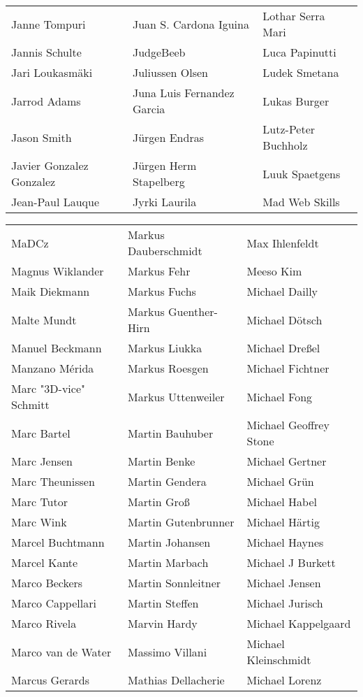 \begin{tabular}{p{4.5cm}p{4.5cm}p{4.5cm}}
Janne Tompuri & Juan S. Cardona Iguina & Lothar Serra Mari \\
Jannis Schulte & JudgeBeeb & Luca Papinutti \\
Jari Loukasmäki & Juliussen Olsen & Ludek Smetana \\
Jarrod Adams & Juna Luis Fernandez Garcia & Lukas Burger \\
Jason Smith & Jürgen Endras & Lutz-Peter Buchholz \\
Javier Gonzalez Gonzalez & Jürgen Herm Stapelberg & Luuk Spaetgens \\
Jean-Paul Lauque & Jyrki Laurila & Mad Web Skills \\
\end{tabular}
\newpage
\setlength{\tabcolsep}{1mm}
\begin{tabular}{p{4.5cm}p{4.5cm}p{4.5cm}}
MaDCz & Markus Dauberschmidt & Max Ihlenfeldt \\
Magnus Wiklander & Markus Fehr & Meeso Kim \\
Maik Diekmann & Markus Fuchs & Michael Dailly \\
Malte Mundt & Markus Guenther-Hirn & Michael Dötsch \\
Manuel Beckmann & Markus Liukka & Michael Dreßel \\
Manzano Mérida & Markus Roesgen & Michael Fichtner \\
Marc "3D-vice" Schmitt & Markus Uttenweiler & Michael Fong \\
Marc Bartel & Martin Bauhuber & Michael Geoffrey Stone \\
Marc Jensen & Martin Benke & Michael Gertner \\
Marc Theunissen & Martin Gendera & Michael Grün \\
Marc Tutor & Martin Groß & Michael Habel \\
Marc Wink & Martin Gutenbrunner & Michael Härtig \\
Marcel Buchtmann & Martin Johansen & Michael Haynes \\
Marcel Kante & Martin Marbach & Michael J Burkett \\
Marco Beckers & Martin Sonnleitner & Michael Jensen \\
Marco Cappellari & Martin Steffen & Michael Jurisch \\
Marco Rivela & Marvin Hardy & Michael Kappelgaard \\
Marco van de Water & Massimo Villani & Michael Kleinschmidt \\
Marcus Gerards & Mathias Dellacherie & Michael Lorenz \\

\end{tabular}
